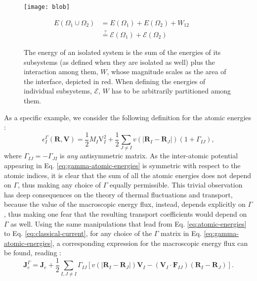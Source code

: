 \begin{figure}
\begin{minipage}{0.5\textwidth}
\centering \texttt{[image: blob]}
\end{minipage}
\begin{minipage}{0.4\textwidth}
\begin{align*}
  E(\Omega_{1}\cup\Omega_2) &= E(\Omega_1) + E(\Omega_2) + W_{12}
                              \qquad \\
  & \overset{?}{=}\mathcal{E}(\Omega_1)+\mathcal{E}(\Omega_2)
\end{align*}
\end{minipage}
\caption{
The energy of an isolated system is the sum of the energies of its
subsystems (as defined when they are isolated as well) plus the
interaction among them, $W$, whose magnitude scales as the area of the
interface, depicted in red. When defining the energies of individual
subsystems, $\mathcal{E}$, $W$ has to be
arbitrarily partitioned among them. 
\label{fig:energy-partition}
}
\end{figure}

As a specific example, we consider the
following definition for the atomic energies \cite{Marcolongo:2014}:
\begin{equation}
  \epsilon_{I}^{\Gamma}(\mathbf{R},\mathbf{V}) =
  \frac{1}{2}M_{I}\mathrm{V}_{I}^{2} + \frac{1}{2}\sum_{J\ne I}
  v(|\mathbf{R}_{I}-\mathbf{R}_{J}|)
  (1+\Gamma_{IJ}), \label{eq:gamma-atomic-energies} 
\end{equation}
where $\Gamma_{IJ}=-\Gamma_{JI}$ is \emph{any} antisymmetric matrix.
As the inter-atomic potential appearing in
Eq. \eqref{eq:gamma-atomic-energies} is symmetric with respect to the
atomic indices, it is clear that the sum of all the atomic energies
does not depend on $\Gamma$, thus making any choice of $\Gamma$
equally permissible. This trivial observation has deep consequences on
the theory of thermal fluctuations and transport, because the value of
the macroscopic energy flux, instead, depends explicitly on $\Gamma$,
thus making one fear that the resulting transport coefficients would
depend on $\Gamma$ as well. Using the same manipulations that lead
from Eq. \eqref{eq:atomic-energies} to
Eq. \eqref{eq:classical-current}, for any choice of the $\Gamma$
matrix in Eq. \eqref{eq:gamma-atomic-energies}, a corresponding
expression for the macroscopic energy flux can be found, reading
\cite{Marcolongo:2014}:
\begin{equation}
\mathbf{J}_{e}^{\Gamma}=\mathbf{J}_{e}+\frac{1}{2}\sum_{I, J\ne
  I}\Gamma_{IJ} \left[v(|\mathbf{R}_{I}-
  \mathbf{R}_{J}|) \mathbf{V}_{I} - (\mathbf{V}_{I}\cdot\mathbf{F}_{IJ})
  (\mathbf{R}_{I}-\mathbf{R}_{J}) \right]. \label{eq:gamma-classical-current} 
\end{equation}

